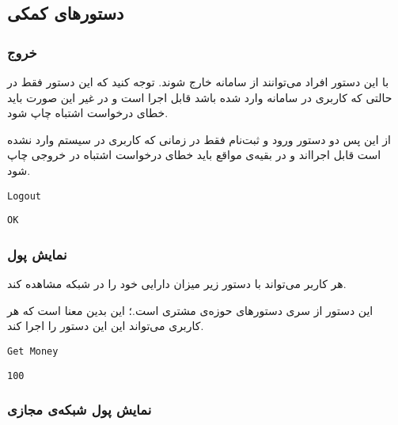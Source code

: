 \documentclass{utap}
\begin{document}
    \subsection{دستورهای کمکی}

    \subsubsection{خروج}

    با این دستور افراد می‌توانند از سامانه خارج شوند. توجه کنید که این دستور فقط در حالتی که کاربری در سامانه وارد شده باشد قابل اجرا است و در غیر این صورت باید خطای درخواست اشتباه چاپ شود.

    از این پس دو دستور ورود و ثبت‌نام فقط در زمانی که کاربری در سیستم وارد نشده است قابل اجرااند و در بقیه‌ی مواقع باید خطای درخواست اشتباه در خروجی چاپ شود.

    \begin{latin}
        \begin{Verbatim}[frame=lines,label={\rl{دستور ورودی}}]
Logout
        \end{Verbatim}
        \begin{Verbatim}[frame=lines,label={\rl{خروجی}}]
OK
        \end{Verbatim}
    \end{latin}

    \subsubsection{نمایش پول}

    هر کاربر می‌تواند با دستور زیر میزان دارایی خود را در شبکه مشاهده کند.

    این دستور از سری دستورهای حوزه‌ی مشتری است.؛ این بدین معنا است که هر کاربری می‌تواند این این دستور را اجرا کند.‌

    \begin{latin}
        \begin{Verbatim}[frame=lines,label={\rl{دستور ورودی}}]
Get Money
        \end{Verbatim}
        \begin{Verbatim}[frame=lines,label={\rl{خروجی}}]
100
        \end{Verbatim}
    \end{latin}

    \subsubsection{نمایش پول شبکه‌ی مجازی}
\end{document}
